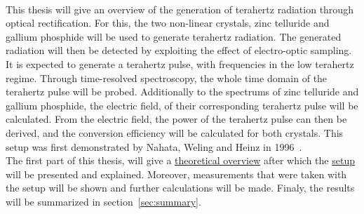 \\
This thesis will give an overview of the generation of terahertz radiation through optical rectification.
For this, the two non-linear crystals, zinc telluride and gallium phosphide will be used to generate terahertz radiation.
The generated radiation will then be detected by exploiting the effect of electro-optic sampling.
\\
It is expected to generate a terahertz pulse, with frequencies in the low terahertz regime.
Through time-resolved spectroscopy, the whole time domain of the terahertz pulse will be probed.
Additionally to the spectrums of zinc telluride and gallium phosphide, the electric field, of their corresponding terahertz pulse will be calculated.
From the electric field, the power of the terahertz pulse can then be derived, and the conversion efficiency will be calculated for both crystals.
This setup was first demonstrated by Nahata, Weling and Heinz in 1996~\cite{ZnTe_Nahata_Weling_1996}.
\\
The first part of this thesis, will give a \hyperref[sec:theory]{theoretical overview} after which the \hyperref[sec:setup]{setup} will be presented and explained.
Moreover, measurements that were taken with the setup will be shown and further calculations will be made.
Finaly, the results will be summarized in section~\ref{sec:summary}.

